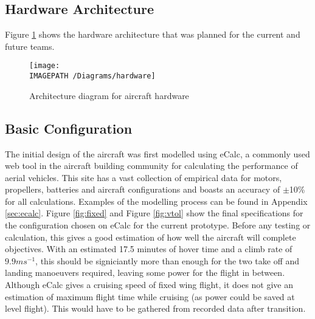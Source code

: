 

\subsection{Hardware Architecture}
Figure \ref{fig:hardwarearch} shows the hardware architecture that was planned for the current and future teams.

\begin{figure}[!h]
	\centering
	\texttt{[image: \\IMAGEPATH /Diagrams/hardware]}
	\caption{Architecture diagram for aircraft hardware}
	\label{fig:hardwarearch}
\end{figure}

\subsection{Basic Configuration}
The initial design of the aircraft was first modelled using eCalc\cite{ref:ecalc}, a commonly used web tool in the aircraft building community for calculating the performance of aerial vehicles. This site has a vast collection of empirical data for motors, propellers, batteries and aircraft configurations and boasts an accuracy of $\pm$10\% for all calculations. Examples of the modelling process can be found in Appendix \ref{sec:ecalc}. Figure \ref{fig:fixed} and Figure \ref{fig:vtol} show the final specifications for the configuration chosen on eCalc for the current prototype. Before any testing or calculation, this gives a good estimation of how well the aircraft will complete objectives. With an estimated 17.5 minutes of hover time and a climb rate of $9.9ms^{-1}$, this should be signiciantly more than enough for the two take off and landing manoeuvers required, leaving some power for the flight in between. Although eCalc gives a cruising speed of fixed wing flight, it does not give an estimation of maximum flight time while cruising (as power could be saved at level flight). This would have to be gathered from recorded data after transition.

